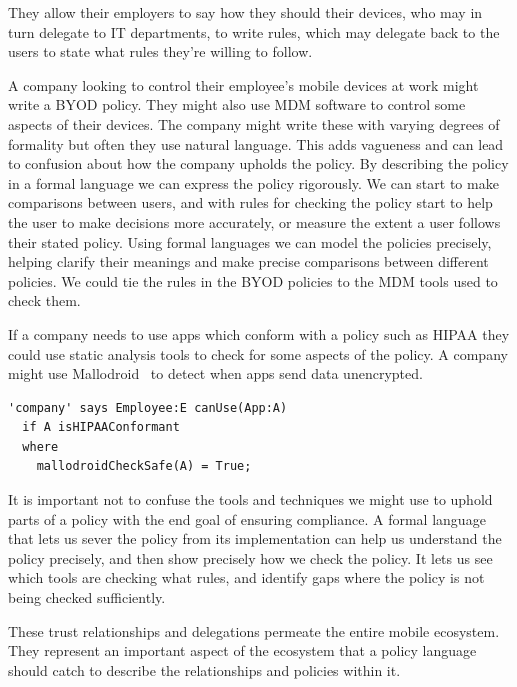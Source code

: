 \documentclass[thesis.tex]{subfiles}
\begin{document}
They allow their employers to say how they should their devices, who
may in turn delegate to IT departments, to write rules, which may
delegate back to the users to state what rules they're willing to
follow.

A company looking to control their employee's mobile devices at work might write
a \ac{BYOD} policy. They might also use \ac{MDM} software to control some
aspects of their devices. The company might write these with varying degrees of
formality but often they use natural language. This adds vagueness
and can lead to confusion about how the company upholds the policy. By
describing the policy in a formal language we can express the policy
rigorously. We can start to make comparisons between users, and with rules
for checking the policy start to help the user to make decisions more
accurately, or measure the extent a user follows their stated policy. Using
formal languages we can model the policies precisely, helping clarify their
meanings and make precise comparisons between different policies. We could tie the
rules in the \ac{BYOD} policies to the \ac{MDM} tools used to
check them.

If a company needs to use apps which conform with a policy such as
\ac{HIPAA} they could use static analysis tools to check for some
aspects of the policy.  A company might use
Mallodroid~\cite{fahl_why_2012} to detect when apps send data unencrypted.  
%
\begin{lstlisting}
'company' says Employee:E canUse(App:A)
  if A isHIPAAConformant
  where
    mallodroidCheckSafe(A) = True;
\end{lstlisting}
%
It is important not to confuse the tools and
techniques we might use to uphold parts of a policy with the end
goal of ensuring compliance.  A formal language that
lets us sever the policy from its implementation can help us
understand the policy precisely, and then show precisely how we check the
policy.  It lets us see which tools are checking what rules, and identify gaps where the policy is not
being checked sufficiently.

These trust relationships and delegations permeate the entire mobile
ecosystem.  They represent an important aspect of the ecosystem that a
policy language should catch to describe the
relationships and policies within it.
\end{document}
